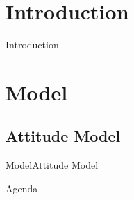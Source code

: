 \section{Introduction}

\begin{frame}{Introduction}{}

\end{frame}

\section{Model}
\subsection{Attitude Model}
\begin{frame}{Model}{Attitude Model}
\end{frame}

\begin{frame}{Agenda}{}
    \tableofcontents
\end{frame}

